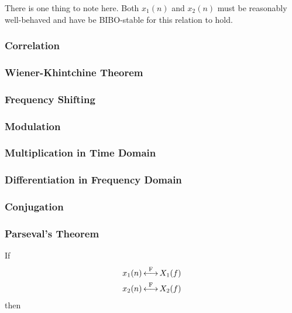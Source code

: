 \begin{remark*}
  There is one thing to note here.
  Both $x_{1}(n)$ and $x_{2}(n)$ must be reasonably well-behaved and have be BIBO-stable for this relation to hold.
\end{remark*}

\subsubsection{Correlation}\label{subsubsec:FourierTransformProperties-Correlation}
\subsubsection{Wiener-Khintchine Theorem}\label{subsubsec:FourierTransformProperties-WienerKhintchineTheorem}
\subsubsection{Frequency Shifting}\label{subsubsec:FourierTransformProperties-FrequencyShifting}
\subsubsection{Modulation}\label{subsubsec:FourierTransformProperties-Modulation}
\subsubsection{Multiplication in Time Domain}\label{subsubsec:FourierTransformProperties-MultiplicationTimeDomain}
\subsubsection{Differentiation in Frequency Domain}\label{subsubsec:FourierTransformProperties-DifferentiationFrequencyDomain}
\subsubsection{Conjugation}\label{subsubsec:FourierTransformProperties-Conjugation}
\subsubsection{Parseval's Theorem}\label{subsubsec:FourierTransformProperties-ParsevalsTheorem}
If
\begin{equation*}
  \begin{aligned}
    x_{1}(n) &\operatorname{\overset{F}{\longleftrightarrow}} X_{1}(f) \\
    x_{2}(n) &\operatorname{\overset{F}{\longleftrightarrow}} X_{2}(f) \\
  \end{aligned}
\end{equation*}
then

